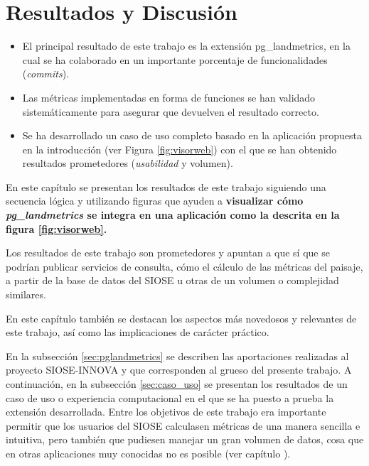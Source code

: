 \chapter{Resultados y Discusión}\label{chap:result}

\begin{graybox}
\begin{itemize}
\item El principal resultado de este trabajo es la extensión pg\_landmetrics, en la cual se ha colaborado en un importante porcentaje de funcionalidades (\textit{commits}).
\item Las métricas implementadas en forma de funciones se han validado sistemáticamente para asegurar que devuelven el resultado correcto.
\item Se ha desarrollado un caso de uso completo basado en la aplicación propuesta en la introducción (ver Figura \ref{fig:visorweb}) con el que se han obtenido resultados prometedores (\textit{usabilidad} y volumen).
\end{itemize}
\end{graybox}


En este capítulo se presentan los resultados de este trabajo siguiendo una secuencia lógica y utilizando  figuras que ayuden a \textbf{visualizar cómo \textit{pg\_landmetrics} se integra en una aplicación como la descrita en la figura \ref{fig:visorweb}.}

Los resultados de este trabajo son prometedores y apuntan a que sí que se podrían publicar servicios de consulta, cómo el cálculo de las métricas del paisaje, a partir de la base de datos del SIOSE u otras de un volumen o complejidad similares.

En este capítulo también se destacan los  aspectos más novedosos y relevantes de este trabajo, así como las implicaciones de carácter práctico.

En la subsección \ref{sec:pglandmetrics} se describen las aportaciones realizadas al proyecto SIOSE-INNOVA y que corresponden al grueso del presente trabajo. A continuación, en la subsección \ref{sec:caso_uso} se presentan los resultados de un caso de uso o experiencia computacional en el que se ha puesto a prueba la extensión desarrollada. Entre los objetivos de este trabajo era importante permitir que los usuarios del SIOSE calculasen métricas de una manera sencilla e intuitiva, pero también que pudiesen manejar un gran volumen de datos, cosa que en otras aplicaciones muy conocidas no es posible (ver capítulo ).


